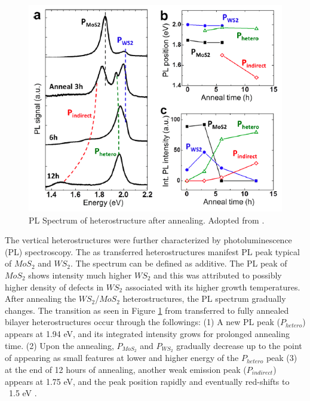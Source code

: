 \begin{figure}[h]
	\begin{center}
		\includegraphics[scale=1]{Heterostructures/HeterostructurePLSpectrumIntro.png}
		\caption{PL Spectrum of heterostructure after annealing. Adopted from \cite{Tongay2014}.}
		\label{fig:HeterostructurePLSpectrumIntro}
	\end{center}
\end{figure}

The vertical heterostructures were further characterized by photoluminescence (PL) spectroscopy. The as transferred heterostructures manifest PL peak typical of $MoS_2$ and $WS_2$. The spectrum can be defined as additive. The PL peak of $MoS_2$ shows intensity much higher $WS_2$ and this was attributed to possibly higher density of defects in $WS_2$ associated with its higher growth temperatures. After annealing the $WS_2$/$MoS_2$ heterostructures, the PL spectrum gradually changes. The transition as seen in Figure \ref{fig:HeterostructurePLSpectrumIntro} from transferred to fully annealed bilayer heterostructures occur through the followings: (1) A new PL peak ($P_{hetero}$) appears at 1.94 eV, and its integrated intensity grows for prolonged annealing time. (2) Upon the annealing, $P_{MoS_2}$ and $P_{WS_2}$ gradually decrease up to the point of appearing as small features at lower and higher energy of the $P_{hetero}$ peak (3) at the end of 12 hours of annealing, another weak emission peak ($P_{indirect}$) appears at 1.75 eV, and the peak position rapidly and eventually red-shifts to ~1.5 eV \cite{Tongay2014}. 

